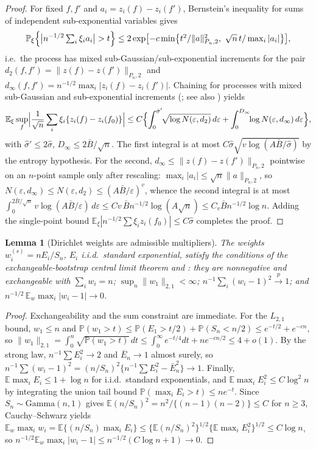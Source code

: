 \documentclass[11pt]{article}
\newtheorem{lemma}{Lemma}
\newcommand{\E}{\mathbb E}
\newcommand{\Pp}{\mathbb P}
\newcommand{\pto}{\overset{p}{\to}}
\newcommand{\eps}{\varepsilon}
\newcommand{\norm}[1]{\lVert #1\rVert}
\begin{document}
\begin{proof}
For fixed $f,f'$ and $a_i=z_i(f)-z_i(f')$, Bernstein's inequality for sums of independent sub-exponential variables gives
\begin{equation*}
\Pp_\xi\Bigl\{\bigl|n^{-1/2}\textstyle\sum_i\xi_ia_i\bigr|>t\Bigr\}\le2\exp\bigl[-c\min\bigl\{t^2/\norm{a}_{P_n,2}^2,\ \sqrt n\,t/\max_i|a_i|\bigr\}\bigr],
\end{equation*}
i.e.\ the process has mixed sub-Gaussian/sub-exponential increments for the pair $d_2(f,f')=\norm{z(f)-z(f')}_{P_n,2}$ and $d_\infty(f,f')=n^{-1/2}\max_i|z_i(f)-z_i(f')|$. Chaining for processes with mixed sub-Gaussian and sub-exponential increments (\citealp{dirksen2015}; see also \citealp[Section~2.2]{vdvwellner1996}) yields
\begin{equation*}
\E_\xi\sup_{f}\Bigl|\frac1{\sqrt n}\sum_i\xi_i\{z_i(f)-z_i(f_0)\}\Bigr|
\le C\Bigl\{\int_0^{\hat\sigma'}\!\!\sqrt{\log N(\eps,d_2)}\,d\eps
+\int_0^{D_\infty}\!\!\log N(\eps,d_\infty)\,d\eps\Bigr\},
\end{equation*}
with $\hat\sigma'\le2\hat\sigma$, $D_\infty\le2\bar B/\sqrt n$. The first integral is at most $C\hat\sigma\sqrt{v\log(A\bar B/\hat\sigma)}$ by the entropy hypothesis. For the second, $d_\infty\le\norm{z(f)-z(f')}_{P_n,2}$ pointwise on an $n$-point sample only after rescaling: $\max_i|a_i|\le\sqrt n\norm{a}_{P_n,2}$, so $N(\eps,d_\infty)\le N(\eps,d_2)\le(A\bar B/\eps)^v$, whence the second integral is at most
$\int_0^{2\bar B/\sqrt n}v\log(A\bar B/\eps)\,d\eps\le Cv\,\bar Bn^{-1/2}\log(A\sqrt n)\le C_v\bar Bn^{-1/2}\log n$.
Adding the single-point bound $\E_\xi|n^{-1/2}\sum\xi_iz_i(f_0)|\le C\hat\sigma$ completes the proof.
\end{proof}

\begin{lemma}[Dirichlet weights are admissible multipliers]\label{lem:pwcheck}
The weights $w^{(s)}_i=nE_i/S_n$, $E_i$ i.i.d.\ standard exponential, satisfy the conditions of the exchangeable-bootstrap central limit theorem \citep[Theorem~2.2]{praestgaard1993} and \citep[Theorem~3.6.13]{vdvwellner1996}: they are nonnegative and exchangeable with $\sum_iw_i=n$; $\sup_n\norm{w_1}_{2,1}<\infty$; $n^{-1}\sum_i(w_i-1)^2\pto1$; and $n^{-1/2}\,\E_w\max_i|w_i-1|\to0$.
\end{lemma}

\begin{proof}
Exchangeability and the sum constraint are immediate. For the $L_{2,1}$ bound, $w_1\le n$ and
$\Pp(w_1>t)\le\Pp(E_1>t/2)+\Pp(S_n<n/2)\le e^{-t/2}+e^{-cn}$,
so $\norm{w_1}_{2,1}=\int_0^n\sqrt{\Pp(w_1>t)}\,dt\le\int_0^\infty e^{-t/4}dt+ne^{-cn/2}\le4+o(1)$.
By the strong law, $n^{-1}\sum E_i^2\to2$ and $\bar E_n\to1$ almost surely, so
$n^{-1}\sum(w_i-1)^2=(n/S_n)^2\{n^{-1}\sum E_i^2-\bar E_n^2\}\to1$.
Finally, $\E\max_iE_i\le1+\log n$ for i.i.d.\ standard exponentials, and $\E\max_iE_i^2\le C\log^2n$ by integrating the union tail bound $\Pp(\max_iE_i>t)\le ne^{-t}$. Since $S_n\sim\mathrm{Gamma}(n,1)$ gives $\E(n/S_n)^2=n^2/\{(n-1)(n-2)\}\le C$ for $n\ge3$, Cauchy--Schwarz yields $\E_w\max_iw_i=\E\{(n/S_n)\max_iE_i\}\le\{\E(n/S_n)^2\}^{1/2}\{\E\max_iE_i^2\}^{1/2}\le C\log n$, so $n^{-1/2}\E_w\max_i|w_i-1|\le n^{-1/2}(C\log n+1)\to0$.
\end{proof}
\end{document}
